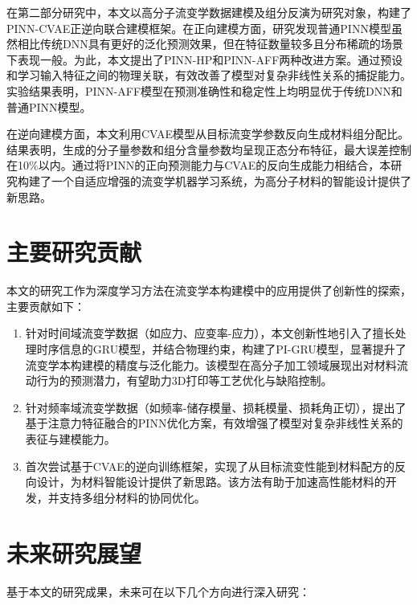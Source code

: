 在第二部分研究中，本文以高分子流变学数据建模及组分反演为研究对象，构建了PINN-CVAE正逆向联合建模框架。在正向建模方面，研究发现普通PINN模型虽然相比传统DNN具有更好的泛化预测效果，但在特征数量较多且分布稀疏的场景下表现一般。为此，本文提出了PINN-HP和PINN-AFF两种改进方案。通过预设和学习输入特征之间的物理关联，有效改善了模型对复杂非线性关系的捕捉能力。实验结果表明，PINN-AFF模型在预测准确性和稳定性上均明显优于传统DNN和普通PINN模型。

在逆向建模方面，本文利用CVAE模型从目标流变学参数反向生成材料组分配比。结果表明，生成的分子量参数和组分含量参数均呈现正态分布特征，最大误差控制在10\%以内。通过将PINN的正向预测能力与CVAE的反向生成能力相结合，本研究构建了一个自适应增强的流变学机器学习系统，为高分子材料的智能设计提供了新思路。

\section*{主要研究贡献}
本文的研究工作为深度学习方法在流变学本构建模中的应用提供了创新性的探索，主要贡献如下：

\begin{enumerate}[topsep = 0 pt, itemsep= 0 pt, parsep=0pt, partopsep=0pt, leftmargin=0pt, itemindent=44pt, labelsep=6pt, label=(\arabic*)]
  \item 针对时间域流变学数据（如应力、应变率-应力），本文创新性地引入了擅长处理时序信息的GRU模型，并结合物理约束，构建了PI-GRU模型，显著提升了流变学本构建模的精度与泛化能力。该模型在高分子加工领域展现出对材料流动行为的预测潜力，有望助力3D打印等工艺优化与缺陷控制。
  \item 针对频率域流变学数据（如频率-储存模量、损耗模量、损耗角正切），提出了基于注意力特征融合的PINN优化方案，有效增强了模型对复杂非线性关系的表征与建模能力。
  \item 首次尝试基于CVAE的逆向训练框架，实现了从目标流变性能到材料配方的反向设计，为材料智能设计提供了新思路。该方法有助于加速高性能材料的开发，并支持多组分材料的协同优化。
\end{enumerate}

\section*{未来研究展望}
基于本文的研究成果，未来可在以下几个方向进行深入研究：

